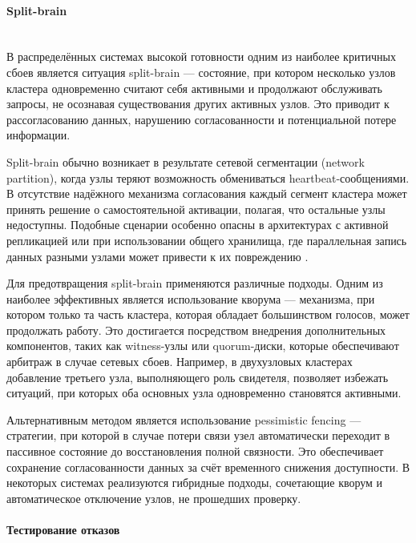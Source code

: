 \paragraph{Split-brain} ~\\

В распределённых системах высокой готовности одним из наиболее критичных сбоев является ситуация split-brain — состояние, при котором несколько узлов кластера одновременно считают себя активными и продолжают обслуживать запросы, не осознавая существования других активных узлов. Это приводит к рассогласованию данных, нарушению согласованности и потенциальной потере информации.

Split-brain обычно возникает в результате сетевой сегментации (network partition), когда узлы теряют возможность обмениваться heartbeat-сообщениями. В отсутствие надёжного механизма согласования каждый сегмент кластера может принять решение о самостоятельной активации, полагая, что остальные узлы недоступны. Подобные сценарии особенно опасны в архитектурах с активной репликацией или при использовании общего хранилища, где параллельная запись данных разными узлами может привести к их повреждению \autocite{SplitBrainEtcd}.

Для предотвращения split-brain применяются различные подходы. Одним из наиболее эффективных является использование кворума — механизма, при котором только та часть кластера, которая обладает большинством голосов, может продолжать работу. Это достигается посредством внедрения дополнительных компонентов, таких как witness-узлы или quorum-диски, которые обеспечивают арбитраж в случае сетевых сбоев. Например, в двухузловых кластерах добавление третьего узла, выполняющего роль свидетеля, позволяет избежать ситуаций, при которых оба основных узла одновременно становятся активными.

Альтернативным методом является использование pessimistic fencing — стратегии, при которой в случае потери связи узел автоматически переходит в пассивное состояние до восстановления полной связности. Это обеспечивает сохранение согласованности данных за счёт временного снижения доступности. В некоторых системах реализуются гибридные подходы, сочетающие кворум и автоматическое отключение узлов, не прошедших проверку.

\paragraph{Тестирование отказов} ~\\

